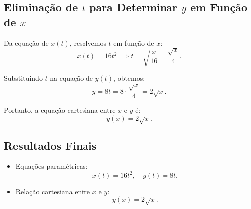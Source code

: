 \subsection*{Eliminação de \(t\) para Determinar \(y\) em Função de \(x\)}
Da equação de \(x(t)\), resolvemos \(t\) em função de \(x\):
\[
x(t) = 16t^2 \implies t = \sqrt{\frac{x}{16}} = \frac{\sqrt{x}}{4}.
\]

Substituindo \(t\) na equação de \(y(t)\), obtemos:
\[
y = 8t = 8 \cdot \frac{\sqrt{x}}{4} = 2\sqrt{x}.
\]

Portanto, a equação cartesiana entre \(x\) e \(y\) é:
\[
y(x) = 2\sqrt{x}.
\]

\subsection*{Resultados Finais}
\begin{itemize}
    \item Equações paramétricas:
    \[
    x(t) = 16t^2, \quad y(t) = 8t.
    \]
    \item Relação cartesiana entre \(x\) e \(y\):
    \[
    y(x) = 2\sqrt{x}.
    \]
\end{itemize}
